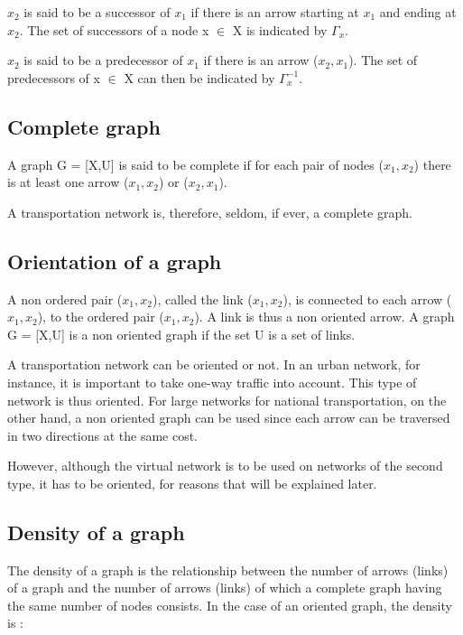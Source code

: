 $x_2$ is said to be a successor of $x_1$ if there is an arrow starting at $x_1$
and ending at $x_2$. The set of successors of a node x $\in$ X is indicated by
$\Gamma_x$.

$x_2$ is said to be a predecessor of $x_1$ if there is an arrow ($x_2,x_1$). The
set of predecessors of x $\in$ X can then be indicated by $\Gamma_x^{-1}$.




\subsection{Complete graph}


A graph G = [X,U] is said to be complete if for each pair of nodes ($x_1,x_2$)
there is at least one arrow ($x_1,x_2$) or ($x_2,x_1$).

A transportation network is, therefore, seldom, if ever, a complete graph.




\subsection{Orientation of a graph}


A non ordered pair ($x_1,x_2$), called the link ($x_1,x_2$), is connected to
each arrow ($x_1,x_2$), to the ordered pair ($x_1,x_2$).  A link is thus a non
oriented arrow. A graph G = [X,U] is a non oriented graph if the set U is a set
of links.

A transportation network can be oriented or not.  In an urban network, for
instance, it is important to take one-way traffic into account.  This type of
network is thus oriented.  For large networks for national transportation, on
the other hand, a non oriented graph can be used since each arrow can be
traversed in two directions at the same cost.

However, although the virtual network is to be used on networks of the second type,
it has to be oriented, for reasons that will be explained later.





\subsection{Density of a graph}


The density of a graph is the relationship between the number of arrows (links)
of a graph and the number of arrows (links) of which a complete graph having the
same number of nodes consists. In the case of an oriented graph, the density is
:

